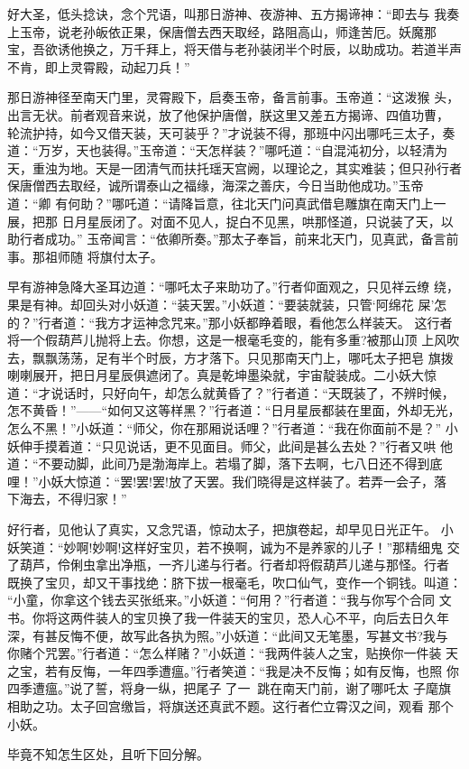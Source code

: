 好大圣，低头捻诀，念个咒语，叫那日游神、夜游神、五方揭谛神：“即去与
我奏上玉帝，说老孙皈依正果，保唐僧去西天取经，路阻高山，师逢苦厄。妖魔那
宝，吾欲诱他换之，万千拜上，将天借与老孙装闭半个时辰，以助成功。若道半声
不肯，即上灵霄殿，动起刀兵！”

那日游神径至南天门里，灵霄殿下，启奏玉帝，备言前事。玉帝道：“这泼猴
头，出言无状。前者观音来说，放了他保护唐僧，朕这里又差五方揭谛、四值功曹，
轮流护持，如今又借天装，天可装乎？”才说装不得，那班中闪出哪吒三太子，奏
道：“万岁，天也装得。”玉帝道：“天怎样装？”哪吒道：“自混沌初分，以轻清为
天，重浊为地。天是一团清气而扶托瑶天宫阙，以理论之，其实难装；但只孙行者
保唐僧西去取经，诚所谓泰山之福缘，海深之善庆，今日当助他成功。”玉帝道：“卿
有何助？”哪吒道：“请降旨意，往北天门问真武借皂雕旗在南天门上一展，把那
日月星辰闭了。对面不见人，捉白不见黑，哄那怪道，只说装了天，以助行者成功。”
玉帝闻言：“依卿所奏。”那太子奉旨，前来北天门，见真武，备言前事。那祖师随
将旗付太子。

早有游神急降大圣耳边道：“哪吒太子来助功了。”行者仰面观之，只见祥云缭
绕，果是有神。却回头对小妖道：“装天罢。”小妖道：“要装就装，只管‘阿绵花
屎’怎的？”行者道：“我方才运神念咒来。”那小妖都睁着眼，看他怎么样装天。
这行者将一个假葫芦儿抛将上去。你想，这是一根毫毛变的，能有多重?被那山顶
上风吹去，飘飘荡荡，足有半个时辰，方才落下。只见那南天门上，哪吒太子把皂
旗拨喇喇展开，把日月星辰俱遮闭了。真是乾坤墨染就，宇宙靛装成。二小妖大惊
道：“才说话时，只好向午，却怎么就黄昏了？”行者道：“天既装了，不辨时候，
怎不黄昏！”——“如何又这等样黑？”行者道：“日月星辰都装在里面，外却无光，
怎么不黑！”小妖道：“师父，你在那厢说话哩？”行者道：“我在你面前不是？”
小妖伸手摸着道：“只见说话，更不见面目。师父，此间是甚么去处？”行者又哄
他道：“不要动脚，此间乃是渤海岸上。若塌了脚，落下去啊，七八日还不得到底
哩！”小妖大惊道：“罢!罢!罢!放了天罢。我们晓得是这样装了。若弄一会子，落
下海去，不得归家！”

好行者，见他认了真实，又念咒语，惊动太子，把旗卷起，却早见日光正午。
小妖笑道：“妙啊!妙啊!这样好宝贝，若不换啊，诚为不是养家的儿子！”那精细鬼
交了葫芦，伶俐虫拿出净瓶，一齐儿递与行者。行者却将假葫芦儿递与那怪。行者
既换了宝贝，却又干事找绝：脐下拔一根毫毛，吹口仙气，变作一个铜钱。叫道：
“小童，你拿这个钱去买张纸来。”小妖道：“何用？”行者道：“我与你写个合同
文书。你将这两件装人的宝贝换了我一件装天的宝贝，恐人心不平，向后去日久年
深，有甚反悔不便，故写此各执为照。”小妖道：“此间又无笔墨，写甚文书?我与
你赌个咒罢。”行者道：“怎么样赌？”小妖道：“我两件装人之宝，贴换你一件装
天之宝，若有反悔，一年四季遭瘟。”行者笑道：“我是决不反悔；如有反悔，也照
你四季遭瘟。”说了誓，将身一纵，把尾子了一，跳在南天门前，谢了哪吒太
子麾旗相助之功。太子回宫缴旨，将旗送还真武不题。这行者伫立霄汉之间，观看
那个小妖。

毕竟不知怎生区处，且听下回分解。